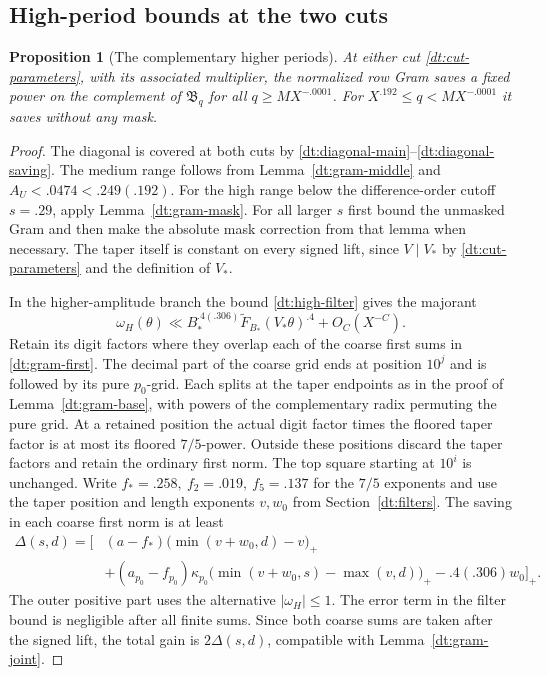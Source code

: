 \documentclass[11pt,a4paper]{article}
\theoremstyle{paperplain}
\newtheorem{proposition}[theorem]{Proposition}
\numberwithin{equation}{section}
\begin{document}
\subsection{High-period bounds at the two cuts}

\begin{proposition}[The complementary higher periods]\label{dt:gram-high}
At either cut \eqref{dt:cut-parameters}, with its associated
multiplier, the normalized row Gram saves a fixed power on
the complement of \(\mathfrak B_q\) for all
\(q\ge MX^{-.0001}\).
For \(X^{.192}\le q<MX^{-.0001}\) it saves without any mask.
\end{proposition}

\begin{proof}
The diagonal is covered at both cuts by
\eqref{dt:diagonal-main}--\eqref{dt:diagonal-saving}.
The medium range follows from Lemma~\ref{dt:gram-middle}
and \(A_U<.0474<.249(.192)\).
For the high range below the difference-order cutoff
\(s=.29\), apply Lemma~\ref{dt:gram-mask}.
For all larger \(s\) first bound the unmasked Gram
and then make the absolute mask correction from that
lemma when necessary. The taper itself is constant on
every signed lift, since \(V\mid V_*\) by
\eqref{dt:cut-parameters} and the definition of \(V_*\).

In the higher-amplitude branch the bound
\eqref{dt:high-filter} gives the majorant
\[
         \omega_H(\theta)
     \ll B_*^{.4(.306)}\widetilde F_{B_*}(V_*\theta)^{.4}
                      +O_C(X^{-C}).
\]
Retain its digit factors where they overlap each of the
coarse first sums in \eqref{dt:gram-first}. The decimal part
of the coarse grid ends at position \(10^j\) and is followed
by its pure \(p_0\)-grid. Each splits at the taper endpoints
as in the proof of Lemma~\ref{dt:gram-base}, with powers
of the complementary radix permuting the pure grid.
At a retained
position the actual digit factor times the floored taper
factor is at most its floored \(7/5\)-power. Outside these
positions discard the taper factors and retain the ordinary
first norm. The top square starting at \(10^i\) is unchanged.
Write \(f_*=.258,\ f_2=.019,\ f_5=.137\) for the
\(7/5\) exponents and use the taper position and length exponents \(v,w_0\)
from Section~\ref{dt:filters}.
The saving in each coarse first norm is at least
\begin{equation}
 \begin{aligned}
 \Delta(s,d)=\Big[&
 (a-f_*)\bigl(\min(v+w_0,d)-v\bigr)_+\\
 &+(a_{p_0}-f_{p_0})\kappa_{p_0}
      \bigl(\min(v+w_0,s)-\max(v,d)\bigr)_+
                  -.4(.306)w_0\Big]_+ .
 \end{aligned}
 \label{dt:gram-filter-gain}
\end{equation}
The outer positive part uses the alternative
\(|\omega_H|\le1\). The error term in the filter bound is
negligible after all finite sums. Since both coarse sums
are taken after the signed lift, the total gain is
\(2\Delta(s,d)\), compatible with
Lemma~\ref{dt:gram-joint}.


\end{proof}
\end{document}
